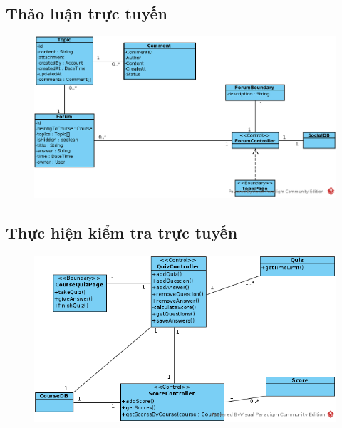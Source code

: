 \documentclass[./../main_file.tex]{subfiles}
\begin{document}
\subsection{Thảo luận trực tuyến}
\begin{figure}[H]
	\centering
	\includegraphics[width=\linewidth]{./images/define_attribute/ucd_atr_forum_discussion.eps}
\end{figure}
\subsection{Thực hiện kiểm tra trực tuyến}
\begin{figure}[H]
	\centering
	\includegraphics[width=\linewidth]{./images/define_operations/ucd_op_per_take_test.png}
\end{figure}
\end{document}
